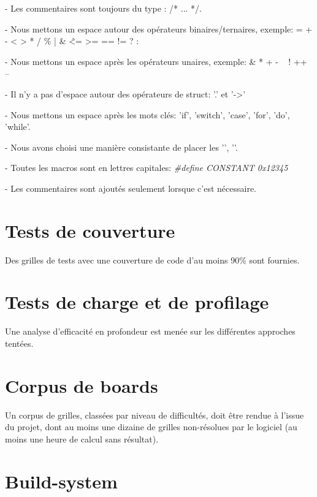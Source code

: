 \documentclass[1]{report}
\begin{document}
            - Les commentaires sont toujours du type : /* ... */.
            
            - Nous mettons un espace autour des opérateurs binaires/ternaires, exemple: =  +  -  <  >  *  /  \%  |  \&  \^  <=  >=  ==  !=  ?  :
            
            - Nous mettons un espace après les opérateurs unaires, exemple: \&  *  +  -  ~  ! ++  --
            
            - Il n'y a pas d'espace autour des opérateurs de struct: '.' et '->'
            
            - Nous mettons un espace après les mots clés: 'if', 'switch', 'case', 'for', 'do', 'while'.
            
            - Nous avons choisi une manière consistante de placer les '{', '}'.
            
            - Toutes les macros sont en lettres capitales: \textit{\#define CONSTANT 0x12345}
            
            - Les commentaires sont ajoutés seulement lorsque c'est nécessaire.

        \section{Tests de couverture}
            
            Des grilles de tests avec une couverture de code d'au moins 90\% sont fournies.

        \section{Tests de charge et de profilage}
            
            Une analyse d'efficacité en profondeur est menée sur les différentes approches tentées.

        \section{Corpus de boards}
            
            Un corpus de grilles, classées par niveau de difficultés, doit être rendue à l'issue du projet, dont au moins une dizaine de grilles non-résolues par le logiciel (au moins une heure de calcul sans résultat).

        \section{Build-system}
            
\end{document}
